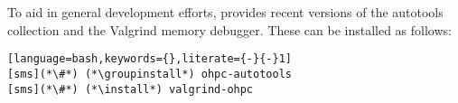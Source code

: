 To aid in general development efforts, \OHPC{} provides recent versions of the \GNU{}
autotools collection and the Valgrind memory debugger. These can be installed as follows:

\begin{lstlisting}[language=bash,keywords={},literate={-}{-}1]
[sms](*\#*) (*\groupinstall*) ohpc-autotools
[sms](*\#*) (*\install*) valgrind-ohpc
\end{lstlisting}

